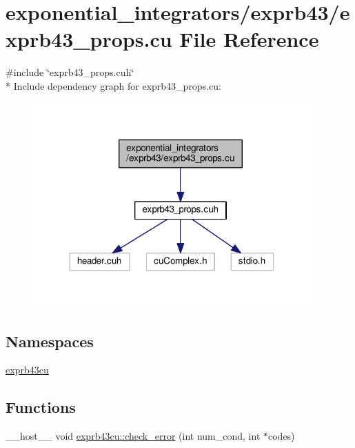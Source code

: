 \hypertarget{exprb43__props_8cu}{}\section{exponential\+\_\+integrators/exprb43/exprb43\+\_\+props.cu File Reference}
\label{exprb43__props_8cu}
{\ttfamily \#include \char`\"{}exprb43\+\_\+props.\+cuh\char`\"{}}\\*
Include dependency graph for exprb43\+\_\+props.\+cu\+:\nopagebreak
\begin{figure}[H]
\begin{center}
\leavevmode
\includegraphics[width=302pt]{exprb43__props_8cu__incl}
\end{center}
\end{figure}
\subsection*{Namespaces}
\begin{DoxyCompactItemize}
\item 
 \hyperlink{namespaceexprb43cu}{exprb43cu}
\end{DoxyCompactItemize}
\subsection*{Functions}
\begin{DoxyCompactItemize}
\item 
\+\_\+\+\_\+host\+\_\+\+\_\+ void \hyperlink{namespaceexprb43cu_aea2a90f02f654f5e485a7bea9c34985f}{exprb43cu\+::check\+\_\+error} (int num\+\_\+cond, int $\ast$codes)
\end{DoxyCompactItemize}
